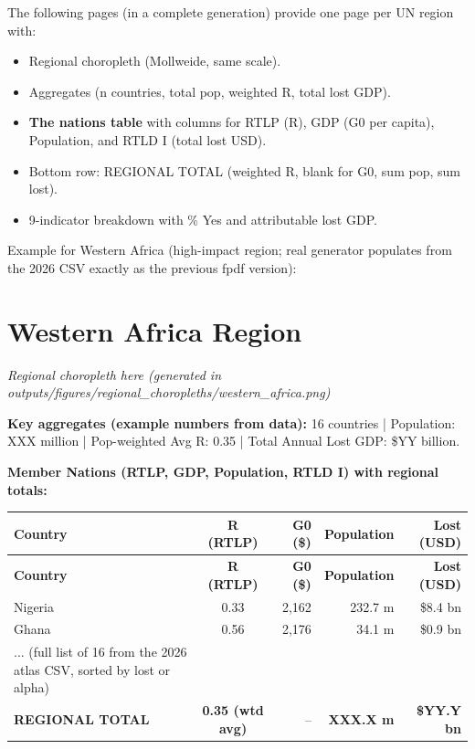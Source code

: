 \documentclass[11pt,a4paper]{book}
\begin{document}
The following pages (in a complete generation) provide one page per UN region with:
\begin{itemize}
  \item Regional choropleth (Mollweide, same scale).
  \item Aggregates (n countries, total pop, weighted R, total lost GDP).
  \item \textbf{The nations table} with columns for RTLP (R), GDP (G0 per capita), Population, and RTLD I (total lost USD).
  \item Bottom row: REGIONAL TOTAL (weighted R, blank for G0, sum pop, sum lost).
  \item 9-indicator breakdown with \% Yes and attributable lost GDP.
\end{itemize}

Example for Western Africa (high-impact region; real generator populates from the 2026 CSV exactly as the previous fpdf version):

\section*{Western Africa Region}

\begin{center}
  \textit{Regional choropleth here (generated in outputs/figures/regional\_choropleths/western\_africa.png)}
\end{center}

\textbf{Key aggregates (example numbers from data):} 16 countries | Population: XXX million | Pop-weighted Avg R: 0.35 | Total Annual Lost GDP: \$YY billion.

\textbf{Member Nations (RTLP, GDP, Population, RTLD I) with regional totals:}

\begin{longtable}{@{}l c r r r@{}}
\toprule
\textbf{Country} & \textbf{R (RTLP)} & \textbf{G0 (\$)} & \textbf{Population} & \textbf{Lost (USD)} \\
\midrule
\endfirsthead
\toprule
\textbf{Country} & \textbf{R (RTLP)} & \textbf{G0 (\$)} & \textbf{Population} & \textbf{Lost (USD)} \\
\midrule
\endhead
\bottomrule
\endfoot
Nigeria & 0.33 & 2,162 & 232.7 m & \$8.4 bn \\
Ghana & 0.56 & 2,176 & 34.1 m & \$0.9 bn \\
... (full list of 16 from the 2026 atlas CSV, sorted by lost or alpha) \\
\bottomrule
\textbf{REGIONAL TOTAL} & \textbf{0.35 (wtd avg)} & -- & \textbf{XXX.X m} & \textbf{\$YY.Y bn} \\
\bottomrule
\end{longtable}
\end{document}
